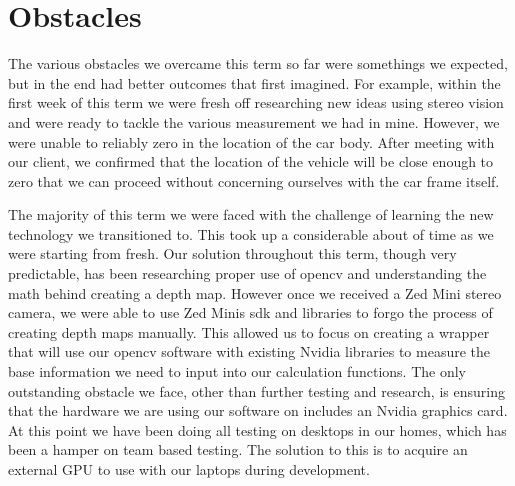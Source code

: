 \documentclass[onecolumn, draftclsnofoot,10pt, compsoc]{IEEEtran}
\begin{document}
\section{Obstacles} The various obstacles we overcame this term so far were somethings we expected, but in the end had better outcomes that first imagined. For example, within the first week of this term we were fresh off researching new ideas using stereo vision and were ready to tackle the various measurement we had in mine. However, we were unable to reliably zero in the location of the car body. After meeting with our client, we confirmed that the location of the vehicle will be close enough to zero that we can proceed without concerning ourselves with the car frame itself. 
\newline

\noindent The majority of this term we were faced with the challenge of learning the new technology we transitioned to. This took up a considerable about of time as we were starting from fresh. Our solution throughout this term, though very predictable, has been researching proper use of opencv and understanding the math behind creating a depth map. However once we received a Zed Mini stereo camera, we were able to use Zed Minis sdk and libraries to forgo the process of creating depth maps manually. This allowed us to focus on creating a wrapper that will use our opencv software with existing Nvidia libraries to measure the base information we need to input into our calculation functions. The only outstanding obstacle we face, other than further testing and research, is ensuring that the hardware we are using our software on includes an Nvidia graphics card. At this point we have been doing all testing on desktops in our homes, which has been a hamper on team based testing. The solution to this is to acquire an external GPU to use with our laptops during development.
\end{document}
